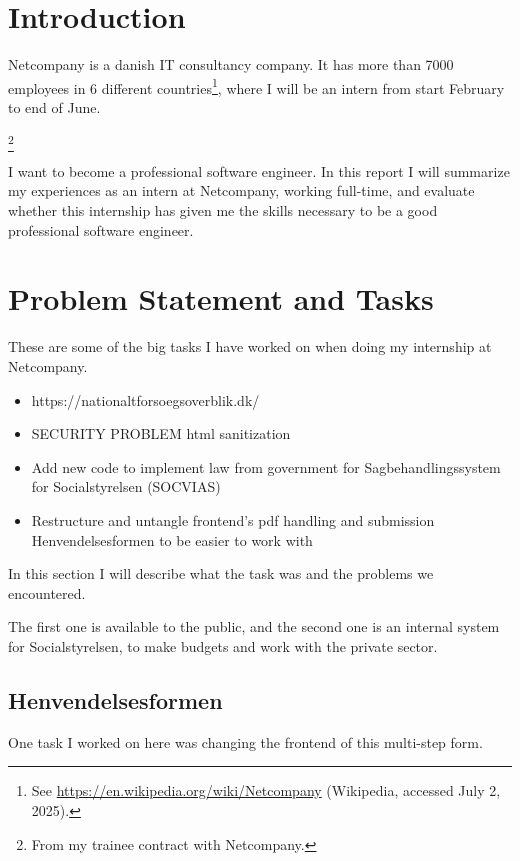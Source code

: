 \documentclass[../main.tex]{subfiles}
\begin{document}
\section{Introduction}

Netcompany is a danish IT consultancy company. It has more than 7000 employees in 6 different countries\footnote{See \url{https://en.wikipedia.org/wiki/Netcompany} (Wikipedia, accessed July 2, 2025).}, where I will be an intern from start February to end of June.

\footnote{From my trainee contract with Netcompany.}

I want to become a professional software engineer. In this report I will summarize my experiences as an intern at Netcompany, working full-time, and evaluate whether this internship has given me the skills necessary to be a good professional software engineer.



\section{Problem Statement and Tasks}


These are some of the big tasks I have worked on when doing my internship at Netcompany.

\begin{itemize}
    \item https://nationaltforsoegsoverblik.dk/ 
    \item SECURITY PROBLEM html sanitization 
    \item Add new code to implement law from government for Sagbehandlingssystem for Socialstyrelsen (SOCVIAS) 
    \item Restructure and untangle frontend's pdf handling and submission Henvendelsesformen to be easier to work with
\end{itemize}

In this section I will describe what the task was and the problems we encountered. 


The first one is available to the public, and the second one is an internal system for Socialstyrelsen, to make budgets and work with the private sector. 

\subsection{Henvendelsesformen}
One task I worked on here was changing the frontend of this multi-step form. 
\end{document}
